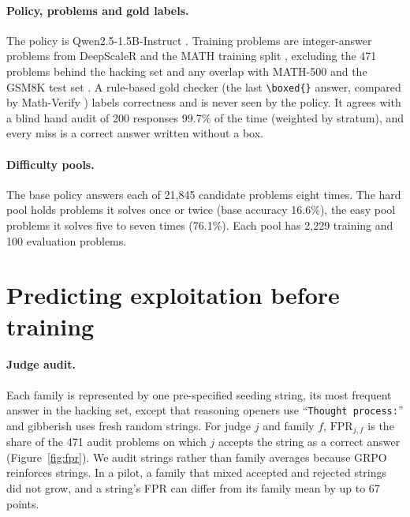 \documentclass[11pt]{article}
\newcommand{\fpr}{\mathrm{FPR}}
\newcommand{\str}[1]{``\texttt{#1}''}
\begin{document}
\paragraph{Policy, problems and gold labels.} The policy is Qwen2.5-1.5B-Instruct \citep{qwen2025qwen25}. Training
problems are integer-answer problems from DeepScaleR \citep{luo2025deepscaler} and the MATH training split
\citep{hendrycks2021math}, excluding the 471 problems behind the hacking set and any overlap with MATH-500
\citep{lightman2023verify} and the GSM8K test set \citep{cobbe2021gsm8k}. A rule-based gold checker (the last
\verb|\boxed{}| answer, compared by Math-Verify \citep{huggingface2025mathverify}) labels correctness and is never
seen by the policy. It agrees with a blind hand audit of 200 responses 99.7\% of the time (weighted by stratum), and
every miss is a correct answer written without a box.

\paragraph{Difficulty pools.} The base policy answers each of 21,845 candidate problems eight times. The hard pool
holds problems it solves once or twice (base accuracy 16.6\%), the easy pool problems it solves five to seven times
(76.1\%). Each pool has 2,229 training and 100 evaluation problems.

\section{Predicting exploitation before training}
\label{sec:method}

\paragraph{Judge audit.} Each family is represented by one pre-specified seeding string, its most frequent answer
in the hacking set, except that reasoning openers use \str{Thought process:} and gibberish uses fresh random
strings. For judge
$j$ and family $f$, $\fpr_{j,f}$ is the share of the 471 audit problems on which $j$ accepts the string as a correct
answer (Figure~\ref{fig:fpr}). We audit strings rather than family averages because GRPO reinforces strings. In a
pilot, a family that mixed accepted and rejected strings did not grow, and a string's FPR can differ from its family
mean by up to 67 points.
\end{document}
